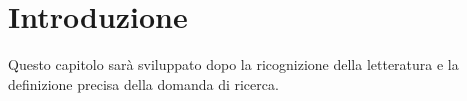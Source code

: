 \chapter{Introduzione}

Questo capitolo sarà sviluppato dopo la ricognizione della letteratura e la definizione precisa della domanda di ricerca.
